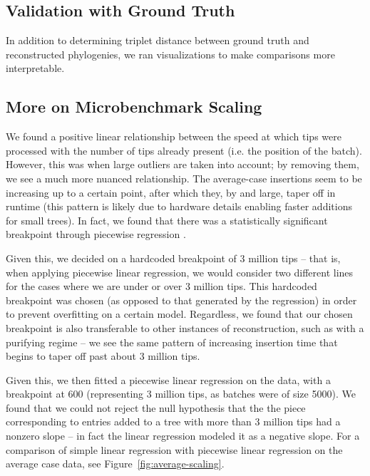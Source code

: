\subsection{Validation with Ground Truth}

In addition to determining triplet distance between ground truth and reconstructed phylogenies, we ran visualizations to make comparisons more interpretable.



\subsection{More on Microbenchmark Scaling}

We found a positive linear relationship between the speed at which tips were processed with the number of tips already present (i.e. the position of the batch). 
However, this was when large outliers are taken into account; by removing them, we see a much more nuanced relationship. 
The average-case insertions seem to be increasing up to a certain point, after which they, by and large, taper off in runtime (this pattern is likely due to hardware details enabling faster additions for small trees). 
In fact, we found that there was a statistically significant breakpoint through piecewise regression \citep{pilgrim2021piecewise,davies1987hypothesis}.

Given this, we decided on a hardcoded breakpoint of 3 million tips -- that is, when applying piecewise linear regression, we would consider two different lines for the cases where we are under or over 3 million tips. 
This hardcoded breakpoint was chosen (as opposed to that generated by the regression) in order to prevent overfitting on a certain model.
Regardless, we found that our chosen breakpoint is also transferable to other instances of reconstruction, such as with a purifying regime -- we see the same pattern of increasing insertion time that begins to taper off past about 3 million tips.

Given this, we then fitted a piecewise linear regression on the data, with a breakpoint at 600 (representing 3 million tips, as batches were of size 5000). 
We found that we could not reject the null hypothesis that the the piece corresponding to entries added to a tree with more than 3 million tips had a nonzero slope -- in fact the linear regression modeled it as a negative slope.
For a comparison of simple linear regression with piecewise linear regression on the average case data, see Figure~\ref{fig:average-scaling}.

